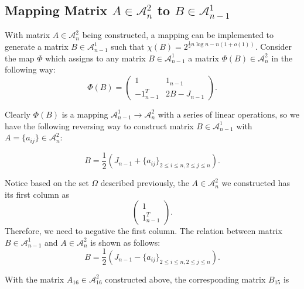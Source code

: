 \documentclass[11pt]{article}
\begin{document}
\subsection{Mapping Matrix $A \in \mathcal{A}_n^2$ to $B \in \mathcal{A}_{n - 1}^1$}\label{section2.3}
With matrix $A \in \mathcal{A}_n^2$ being constructed, a mapping can be implemented to generate a matrix $B \in \mathcal{A}_{n-1}^{1}$ such that $\chi(B)=2^{\frac{1}{2}n\log n-n(1+o(1))}$\cite{ALON1997133}. Consider the map $\Phi$ which assigns to any matrix $B \in \mathcal{A}_{n - 1}^1$ a matrix $\Phi(B) \in \mathcal{A}_{n}^2$ in the following way:
$$ \Phi(B) = \left(\begin{array}{cc} 
1 & 1_{n-1}\\
-1^T_{n-1} & 2B-J_{n-1}
\end{array}\right).
$$

Clearly $\Phi(B)$ is a mapping $\mathcal{A}_{n - 1}^1 \to \mathcal{A}_n^2$ with a series of linear operations, so we have the following reversing way to construct matrix $B \in \mathcal{A}_{n - 1}^1$ with $A=\{a_{ij}\}\in \mathcal{A}_n^2$:

$$B = \frac{1}{2}(J_{n-1}+\{a_{ij}\}_{2\le i\le n, 2\le j\le n}).$$

Notice based on the set $\Omega$ described previously, the $A \in \mathcal{A}_n^2$ we constructed has its first column as
$$ \left(\begin{array}{cc} 
1\\
1^T_{n-1}
\end{array}\right).
$$
Therefore,  we need to negative the first column. The relation between matrix $B \in \mathcal{A}_{n - 1}^1$ and $A \in \mathcal{A}_n^2$ is shown as follows:    
$$B = \frac{1}{2}(J_{n-1}-\{a_{ij}\}_{2\le i\le n, 2\le j\le n}).$$

With the matrix $A_{16} \in \mathcal{A}_{16}^2$ constructed above, the corresponding matrix $B_{15}$ is 
\end{document}
